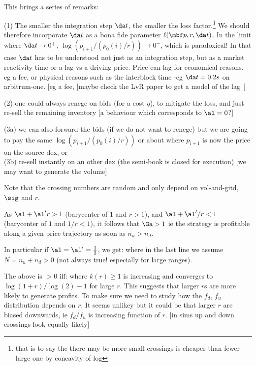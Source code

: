 \documentclass[oneside,twocolumn,12pt]{article}
\begin{document}
This brings a series of remarks:

(1) The smaller the integration step $\da t$, the smaller the loss factor.\footnote{that is to say the
there may be more small crossings is cheaper than fewer large one by concavity of log}
We should therefore incorporate $\da t$ as a bona fide parameter $\ell(\mbf p, r,\da t)$.
In the limit where $\da t\to0^+$, $\log(p_{i+1}/(p_0(i)/r))\to 0^-$, which is paradoxical!
In that case $\da t$ has to be understood not just as an integration step,
but as a market reactivity time or a lag vs a driving price. Price can lag for economical reasons,
eg a fee, or physical reasons such as the interblock time -eg $\da t=0.2 s$ on arbitrum-one.
[eg a fee, ]maybe check the LvR paper to get a model of the lag~\cite{milionis2022automated}]

(2) one could always renege on bids (for a cost $q$), to mitigate the loss, 
and just re-sell the remaining inventory [a behaviour which corresponds to $\al=0$?]

(3a) we can also forward the bids (if we do not want to renege) but we are going to pay the same
$\log(p_{i+1}/(p_0(i)/r))$ or about where $p_{i+1}$ is now the price on the source dex, or 
\\(3b) re-sell instantly on an other dex (the semi-book is closed for execution) 
[we may want to generate the volume]


Note that the crossing numbers are random and only depend on vol-and-grid, $\sig$ and $r$.

As
$\al+\al' r>1$ (barycenter of $1$ and $r>1$), and  
$\al+\al'/r<1$ (barycenter of $1$ and $1/r<1$),
it follows that $\Ga>1$ ie the strategy is profitable along a given price trajectory as soon as $n_u>n_d$.

In particular if $\al=\al'=\frac12$, we get:
where in the last line we assume $N=n_u+n_d>0$ (not always true! especially for large ranges).

The above is $>0$ iff:
where $k(r)\geq 1$ is increasing and converges to $\log(1+r)/\log(2) -1$ for large $r$.
This suggests that  larger $r$s are more likely to generate profits. To make sure we need
to study how the $f_d$, $f_u$ distribution depends on $r$. It seems unlikey but it could be that larger $r$ are biased 
downwards, ie $f_d/f_u$ is increasing function of $r$. [in sims up and down crossings 
look equally likely]
\end{document}
